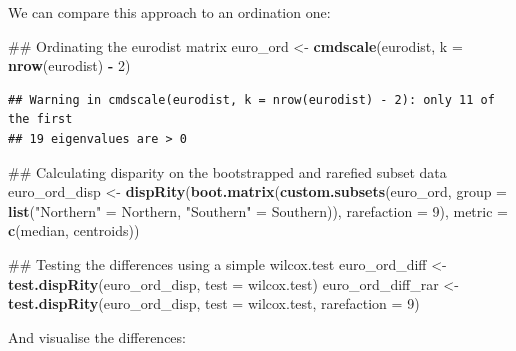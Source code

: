 \documentclass[]{book}
\newenvironment{Shaded}{\begin{snugshade}}{\end{snugshade}}
\newcommand{\KeywordTok}[1]{\textcolor[rgb]{0.13,0.29,0.53}{\textbf{#1}}}
\newcommand{\DataTypeTok}[1]{\textcolor[rgb]{0.13,0.29,0.53}{#1}}
\newcommand{\DecValTok}[1]{\textcolor[rgb]{0.00,0.00,0.81}{#1}}
\newcommand{\StringTok}[1]{\textcolor[rgb]{0.31,0.60,0.02}{#1}}
\newcommand{\OperatorTok}[1]{\textcolor[rgb]{0.81,0.36,0.00}{\textbf{#1}}}
\newcommand{\NormalTok}[1]{#1}
\theoremstyle{definition}
\theoremstyle{definition}
\theoremstyle{remark}
\begin{document}
We can compare this approach to an ordination one:

\begin{Shaded}
\begin{Highlighting}[]
\NormalTok{## Ordinating the eurodist matrix}
\NormalTok{euro_ord <-}\StringTok{ }\KeywordTok{cmdscale}\NormalTok{(eurodist, }\DataTypeTok{k =} \KeywordTok{nrow}\NormalTok{(eurodist) }\OperatorTok{-}\StringTok{ }\DecValTok{2}\NormalTok{)}
\end{Highlighting}
\end{Shaded}

\begin{verbatim}
## Warning in cmdscale(eurodist, k = nrow(eurodist) - 2): only 11 of the first
## 19 eigenvalues are > 0
\end{verbatim}

\begin{Shaded}
\begin{Highlighting}[]
\NormalTok{## Calculating disparity on the bootstrapped and rarefied subset data}
\NormalTok{euro_ord_disp <-}\StringTok{ }\KeywordTok{dispRity}\NormalTok{(}\KeywordTok{boot.matrix}\NormalTok{(}\KeywordTok{custom.subsets}\NormalTok{(euro_ord, }\DataTypeTok{group =}
        \KeywordTok{list}\NormalTok{(}\StringTok{"Northern"}\NormalTok{ =}\StringTok{ }\NormalTok{Northern, }\StringTok{"Southern"}\NormalTok{ =}\StringTok{ }\NormalTok{Southern)), }\DataTypeTok{rarefaction =} \DecValTok{9}\NormalTok{),}
        \DataTypeTok{metric =} \KeywordTok{c}\NormalTok{(median, centroids))}

\NormalTok{## Testing the differences using a simple wilcox.test}
\NormalTok{euro_ord_diff <-}\StringTok{ }\KeywordTok{test.dispRity}\NormalTok{(euro_ord_disp, }\DataTypeTok{test =}\NormalTok{ wilcox.test)}
\NormalTok{euro_ord_diff_rar <-}\StringTok{ }\KeywordTok{test.dispRity}\NormalTok{(euro_ord_disp, }\DataTypeTok{test =}\NormalTok{ wilcox.test, }\DataTypeTok{rarefaction =} \DecValTok{9}\NormalTok{)}
\end{Highlighting}
\end{Shaded}

And visualise the differences:
\end{document}
